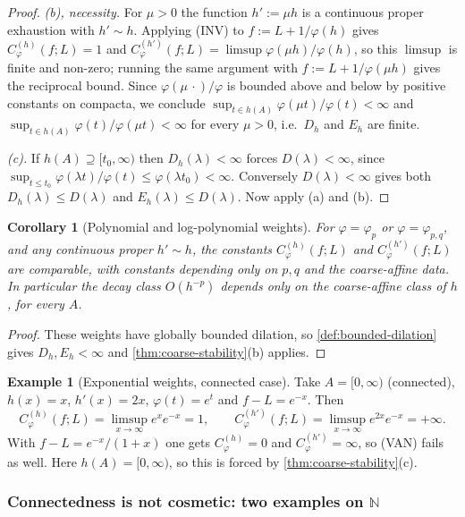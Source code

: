 \documentclass[11pt,a4paper]{article}
\numberwithin{equation}{section}
\theoremstyle{plain}
\newtheorem{corollary}[theorem]{Corollary}
\theoremstyle{definition}
\newtheorem{example}[theorem]{Example}
\theoremstyle{remark}
\newcommand{\N}{\mathbb{N}}
\begin{document}
\begin{proof}
\emph{(b), necessity.} For $\mu>0$ the function $h':=\mu h$ is a continuous proper
exhaustion with $h'\sim h$. Applying (INV) to $f:=L+1/\varphi(h)$ gives
$C^{(h)}_\varphi(f;L)=1$ and
$C^{(h')}_\varphi(f;L)=\limsup\varphi(\mu h)/\varphi(h)$, so this $\limsup$ is finite and
non-zero; running the same argument with $f:=L+1/\varphi(\mu h)$ gives the reciprocal
bound. Since $\varphi(\mu\,\cdot)/\varphi$ is bounded above and below by positive constants
on compacta, we conclude $\sup_{t\in h(A)}\varphi(\mu t)/\varphi(t)<\infty$ and
$\sup_{t\in h(A)}\varphi(t)/\varphi(\mu t)<\infty$ for every $\mu>0$, i.e.\ $D_h$ and
$E_h$ are finite.

\emph{(c).} If $h(A)\supseteq[t_0,\infty)$ then $D_h(\lambda)<\infty$ forces
$D(\lambda)<\infty$, since $\sup_{t\le t_0}\varphi(\lambda t)/\varphi(t)\le\varphi(\lambda t_0)<\infty$.
Conversely $D(\lambda)<\infty$ gives both $D_h(\lambda)\le D(\lambda)$ and
$E_h(\lambda)\le D(\lambda)$. Now apply (a) and (b).
\end{proof}

\begin{corollary}[Polynomial and log-polynomial weights]\label{cor:poly-invariance}
For $\varphi=\varphi_p$ or $\varphi=\varphi_{p,q}$, and any continuous proper $h'\sim h$,
the constants $C^{(h)}_\varphi(f;L)$ and $C^{(h')}_\varphi(f;L)$ are comparable, with
constants depending only on $p,q$ and the coarse-affine data. In particular the decay class
$O(h^{-p})$ depends only on the coarse-affine class of $h$, for every $A$.
\end{corollary}

\begin{proof}
These weights have globally bounded dilation, so \cref{def:bounded-dilation} gives
$D_h,E_h<\infty$ and \cref{thm:coarse-stability}(b) applies.
\end{proof}

\begin{example}[Exponential weights, connected case]\label{ex:exp-not-invariant}
Take $A=[0,\infty)$ (connected), $h(x)=x$, $h'(x)=2x$, $\varphi(t)=e^{t}$ and
$f-L=e^{-x}$. Then
\[
C^{(h)}_\varphi(f;L)=\limsup_{x\to\infty}e^{x}e^{-x}=1,
\qquad
C^{(h')}_\varphi(f;L)=\limsup_{x\to\infty}e^{2x}e^{-x}=+\infty .
\]
With $f-L=e^{-x}/(1+x)$ one gets $C^{(h)}_\varphi=0$ and $C^{(h')}_\varphi=\infty$, so
(VAN) fails as well. Here $h(A)=[0,\infty)$, so this is forced by
\cref{thm:coarse-stability}(c).
\end{example}

\subsubsection{Connectedness is not cosmetic: two examples on $\N$}
\end{document}

